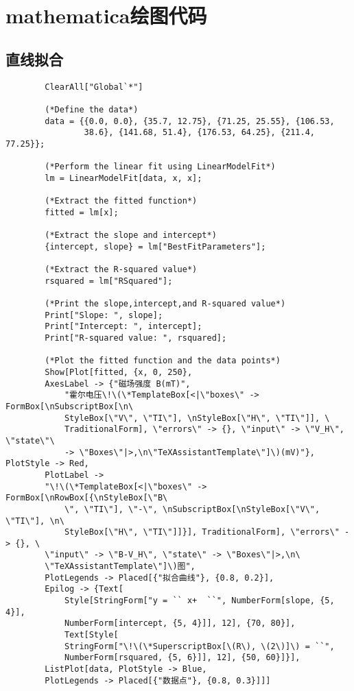 \documentclass[11pt]{article}
\begin{document}
	
	\newpage
	
	\appendix
	
	
	\section{mathematica绘图代码}
	
	\subsection{直线拟合}
	\begin{lstlisting}
		ClearAll["Global`*"]
		
		(*Define the data*)
		data = {{0.0, 0.0}, {35.7, 12.75}, {71.25, 25.55}, {106.53, 
				38.6}, {141.68, 51.4}, {176.53, 64.25}, {211.4, 77.25}};
		
		(*Perform the linear fit using LinearModelFit*)
		lm = LinearModelFit[data, x, x];
		
		(*Extract the fitted function*)
		fitted = lm[x];
		
		(*Extract the slope and intercept*)
		{intercept, slope} = lm["BestFitParameters"];
		
		(*Extract the R-squared value*)
		rsquared = lm["RSquared"];
		
		(*Print the slope,intercept,and R-squared value*)
		Print["Slope: ", slope];
		Print["Intercept: ", intercept];
		Print["R-squared value: ", rsquared];
		
		(*Plot the fitted function and the data points*)
		Show[Plot[fitted, {x, 0, 250}, 
		AxesLabel -> {"磁场强度 B(mT)", 
			"霍尔电压\!\(\*TemplateBox[<|\"boxes\" -> FormBox[\nSubscriptBox[\n\
			StyleBox[\"V\", \"TI\"], \nStyleBox[\"H\", \"TI\"]], \
			TraditionalForm], \"errors\" -> {}, \"input\" -> \"V_H\", \"state\"\
			-> \"Boxes\"|>,\n\"TeXAssistantTemplate\"]\)(mV)"}, PlotStyle -> Red,
		PlotLabel -> 
		"\!\(\*TemplateBox[<|\"boxes\" -> FormBox[\nRowBox[{\nStyleBox[\"B\
			\", \"TI\"], \"-\", \nSubscriptBox[\nStyleBox[\"V\", \"TI\"], \n\
			StyleBox[\"H\", \"TI\"]]}], TraditionalForm], \"errors\" -> {}, \
		\"input\" -> \"B-V_H\", \"state\" -> \"Boxes\"|>,\n\
		\"TeXAssistantTemplate\"]\)图", 
		PlotLegends -> Placed[{"拟合曲线"}, {0.8, 0.2}], 
		Epilog -> {Text[
			Style[StringForm["y = `` x+  ``", NumberForm[slope, {5, 4}], 
			NumberForm[intercept, {5, 4}]], 12], {70, 80}], 
			Text[Style[
			StringForm["\!\(\*SuperscriptBox[\(R\), \(2\)]\) = ``", 
			NumberForm[rsquared, {5, 6}]], 12], {50, 60}]}], 
		ListPlot[data, PlotStyle -> Blue, 
		PlotLegends -> Placed[{"数据点"}, {0.8, 0.3}]]]
	\end{lstlisting}
	
\end{document}
